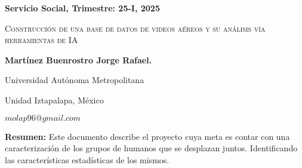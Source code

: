 \documentclass[letterpaper,11pt,twoside]{report}
\date{}
\begin{document}
    \centerline{\bf Servicio Social, Trimestre: 25-I, 2025}
    \centerline{}
    \centerline{}
    \begin{center}
    \Large{\textsc{Construcci\'on de una base de datos de videos a\'ereos y su an\'alisis v\'ia herramientas
de IA
}}
    \end{center}
    \centerline{}
    \centerline{\bf {Martínez Buenrostro Jorge Rafael.}}
    \centerline{}
    \centerline{Universidad Aut\'onoma Metropolitana}
    \centerline{Unidad Iztapalapa, M\'exico}
    \centerline{$molap96@gmail.com$}
    \newtheorem{Theorem}{\quad Theorem}[section]
    \newtheorem{Definition}[Theorem]{\quad Definition}
    \newtheorem{Corollary}[Theorem]{\quad Corollary}
    \newtheorem{Lemma}[Theorem]{\quad Lemma}
    \newtheorem{Example}[Theorem]{\quad Example}
    \bigskip
    \textbf{Resumen:}  Este documento describe el proyecto cuya meta es contar con una caracterización de los grupos de humanos que se desplazan juntos. Identificando las características estadísticas de los mismos.

	

	

	

	
\end{document}
